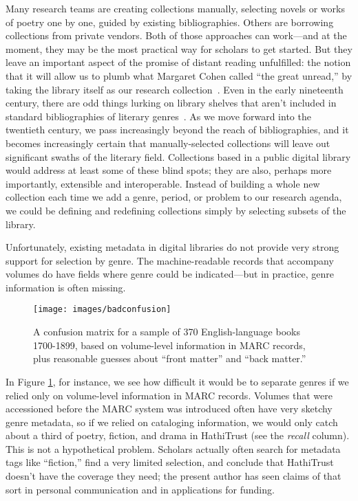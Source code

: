 \documentclass[paper=a4, fontsize=12pt]{scrartcl}
\numberwithin{equation}{section}		%
\numberwithin{figure}{section}			%
\numberwithin{table}{section}				%
\begin{document}
Many research teams are creating collections manually, selecting novels or works of poetry one by one, guided by existing bibliographies. Others are borrowing collections from private vendors. Both of those approaches can work---and at the moment, they may be the most practical way for scholars to get started. But they leave an important aspect of the promise of distant reading unfulfilled: the notion that it will allow us to plumb what Margaret Cohen called ``the great unread,'' by taking the library itself as our research collection~\cite{cohen:unread, moretti:world}. Even in the early nineteenth century, there are odd things lurking on library shelves that aren't included in standard bibliographies of literary genres~\cite{underwood:blurry}. As we move forward into the twentieth century, we pass increasingly beyond the reach of bibliographies, and it becomes increasingly certain that manually-selected collections will leave out significant swaths of the literary field. Collections based in a public digital library would address at least some of these blind spots; they are also, perhaps more importantly, extensible and interoperable. Instead of building a whole new collection each time we add a genre, period, or problem to our research agenda, we could be defining and redefining collections simply by selecting subsets of the library.

Unfortunately, existing metadata in digital libraries do not provide very strong support for selection by genre. The machine-readable records that accompany volumes do have fields where genre could be indicated---but in practice, genre information is often missing.

\begin{figure}[!h]
\centering
\texttt{[image: images/badconfusion]}
\caption{A confusion matrix for a sample of 370 English-language books 1700-1899, based on volume-level information in MARC records, plus reasonable guesses about ``front matter'' and ``back matter.''}
\label{badconfusion}
\end{figure}
\FloatBarrier

In Figure \ref{badconfusion}, for instance, we see how difficult it would be to separate genres if we relied only on volume-level information in MARC records. Volumes that were accessioned before the MARC system was introduced often have very sketchy genre metadata, so if we relied on cataloging information, we would only catch about a third of poetry, fiction, and drama in HathiTrust (see the \textit{recall} column). This is not a hypothetical problem. Scholars actually often search for metadata tags like ``fiction,'' find a very limited selection, and conclude that HathiTrust doesn't have the coverage they need; the present author has seen claims of that sort in personal communication and in applications for funding.
\end{document}
